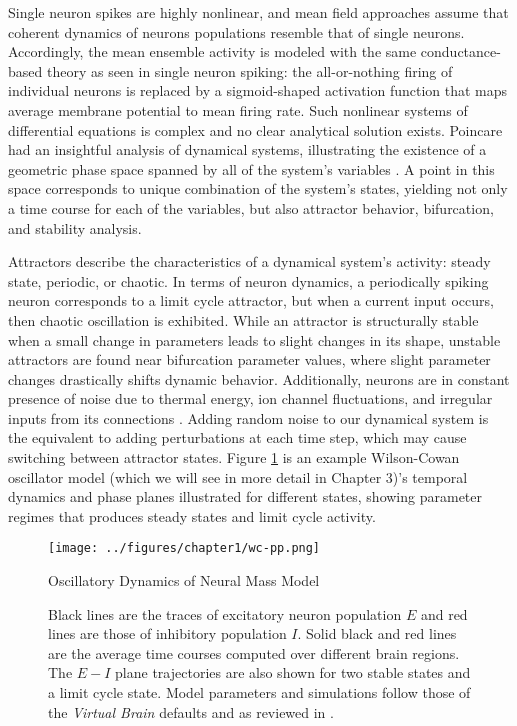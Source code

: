 Single neuron spikes are highly nonlinear, and mean field approaches assume that coherent dynamics of neurons populations resemble that of single neurons. Accordingly, the mean ensemble activity is modeled with the same conductance-based theory as seen in single neuron spiking: the all-or-nothing firing of individual neurons is replaced by a sigmoid-shaped activation function that maps average membrane potential to mean firing rate. Such nonlinear systems of differential equations is complex and no clear analytical solution exists. Poincare had an insightful analysis of dynamical systems, illustrating the existence of a geometric phase space spanned by all of the system's variables \cite{poincare1899methodes}. A point in this space corresponds to unique combination of the system's states, yielding not only a time course for each of the variables, but also attractor behavior, bifurcation, and stability analysis. 

Attractors describe the characteristics of a dynamical system's activity: steady state, periodic, or chaotic. In terms of neuron dynamics, a periodically spiking neuron corresponds to a limit cycle attractor, but when a current input occurs, then chaotic oscillation is exhibited. While an attractor is structurally stable when a small change in parameters leads to slight changes in its shape, unstable attractors are found near bifurcation parameter values, where slight parameter changes drastically shifts dynamic behavior. Additionally, neurons are in constant presence of noise due to thermal energy, ion channel fluctuations, and irregular inputs from its connections \cite{faisal2008noise,mivsic2010brain}. Adding random noise to our dynamical system is the equivalent to adding perturbations at each time step, which may cause switching between attractor states. Figure \ref{fig:wc-pp} is an example Wilson-Cowan oscillator model (which we will see in more detail in Chapter 3)'s temporal dynamics and phase planes illustrated for different states, showing parameter regimes that produces steady states and limit cycle activity. 

\begin{figure}[htbp]
	\centering
	\texttt{[image: ../figures/chapter1/wc-pp.png]}
	\caption{Oscillatory Dynamics of Neural Mass Model}
	\caption*{Black lines are the traces of excitatory neuron population $E$ and red lines are those of inhibitory population $I$. Solid black and red lines are the average time courses computed over different brain regions. The $E-I$ plane trajectories are also shown for two stable states and a limit cycle state. Model parameters and simulations follow those of the \emph{Virtual Brain} defaults and as reviewed in \cite{sanz-leon_mathematical_2015}.}
	\label{fig:wc-pp}
\end{figure}

